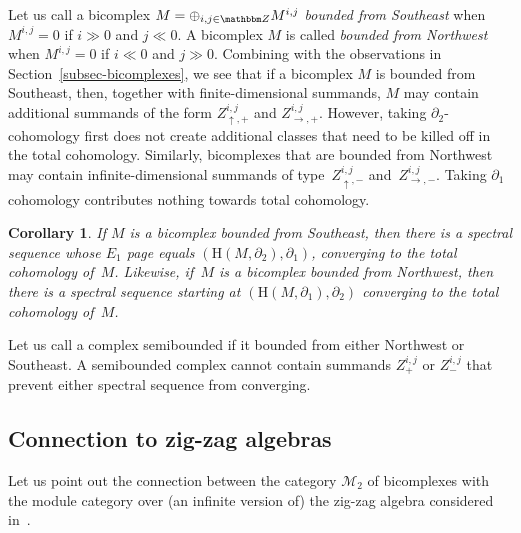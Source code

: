 \documentclass[pdftex]{sigma}
\newtheorem{cor}[thm]{Corollary}
\theoremstyle{definition}
\numberwithin{equation}{section}
\def\Z{{\mathbbm Z}}
\def\dif{\partial}
\def\mc{\mathcal}
\newcommand{\mH}{\mathrm{H}} %
\begin{document}
Let us call a bicomplex $M=\oplus_{i,j\in \Z}M^{i,j}$ \emph{bounded from Southeast} when $M^{i,j}=0$ if $i\gg 0$ and $j \ll 0$. A bicomplex $M$ is called \emph{bounded from Northwest} when $M^{i,j}=0$ if $i \ll 0 $ and $j \gg 0$. Combining with the observations in Section~\ref{subsec-bicomplexes}, we see that if a bicomplex $M$ is bounded from Southeast, then, together with finite-dimensional summands, $M$ may contain additional summands of the form $Z^{i,j}_{\uparrow,+}$ and $Z^{i,j}_{\rightarrow,+}$. However, taking $\dif_2$-cohomology first does not create additional classes that need to be killed off in the total cohomology. Similarly, bicomplexes that are bounded from Northwest may contain infinite-dimensional summands of type~$Z^{i,j}_{\uparrow, -}$ and~$Z^{i,j}_{\rightarrow, -}$. Taking $\dif_1$ cohomology contributes nothing towards total cohomology.

\begin{cor}If $M$ is a bicomplex bounded from Southeast, then there is a spectral sequence whose $E_1$ page equals $(\mH(M,\dif_2),\dif_1)$, converging to the total cohomology of~$M$. Likewise, if~$M$ is a bicomplex bounded from Northwest, then there is a spectral sequence starting at $(\mH(M,\dif_1),\dif_2)$ converging to the total cohomology of~$M$.
\end{cor}

Let us call a complex semibounded if it bounded from either Northwest or Southeast. A semibounded complex cannot contain summands $Z^{i,j}_{+}$ or $Z^{i,j}_{-}$ that prevent either spectral sequence from converging.

\subsection{Connection to zig-zag algebras}\label{subsec-Lambda-2-zig-zag}
Let us point out the connection between the category $\mc{M}_2$ of bicomplexes with the module category over (an infinite version of) the zig-zag algebra considered in~\cite{KhSe}.
\end{document}
